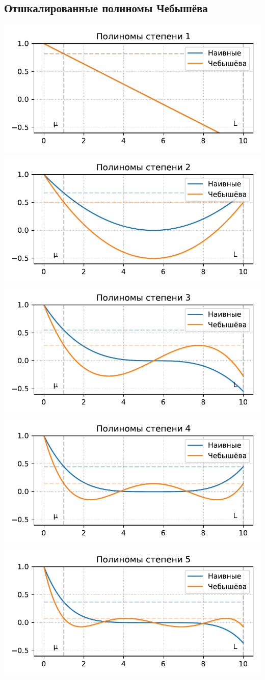 \documentclass[
  russian,
  letterpaper,
  DIV=11,
  numbers=noendperiod]{scrartcl}
\begin{document}
\subsection{Отшкалированные полиномы
Чебышёва}\label{ux43eux442ux448ux43aux430ux43bux438ux440ux43eux432ux430ux43dux43dux44bux435-ux43fux43eux43bux438ux43dux43eux43cux44b-ux447ux435ux431ux44bux448ux451ux432ux430-1}

\includegraphics[width=0.5\columnwidth,height=0.8\textheight,keepaspectratio]{gd_polynoms_1_ru.pdf}
\includegraphics[width=0.5\columnwidth,height=0.8\textheight,keepaspectratio]{gd_polynoms_2_ru.pdf}
\includegraphics[width=0.5\columnwidth,height=0.8\textheight,keepaspectratio]{gd_polynoms_3_ru.pdf}
\includegraphics[width=0.5\columnwidth,height=0.8\textheight,keepaspectratio]{gd_polynoms_4_ru.pdf}
\includegraphics[width=0.5\columnwidth,height=0.8\textheight,keepaspectratio]{gd_polynoms_5_ru.pdf}
\end{document}
